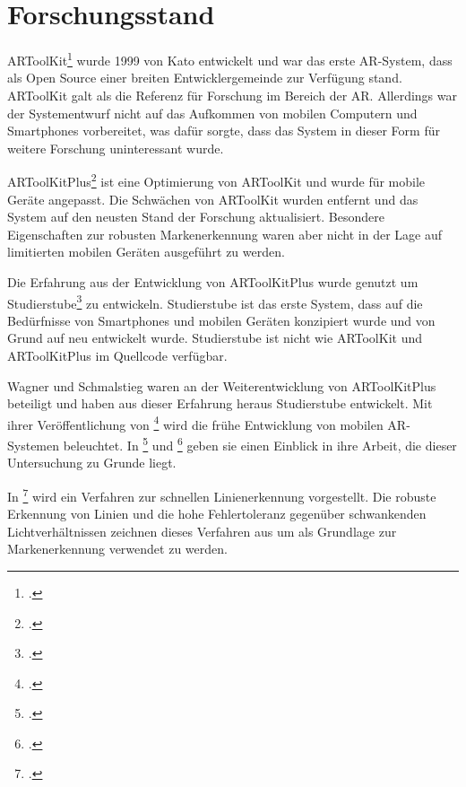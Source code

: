 \section{Forschungsstand} %
\label{sec:forschungsstand}
\begin{comment}
	Forschungsstand: Alle untersuchten Arbeiten aufführen und kurz erklären.
\end{comment}

ARToolKit\footcite{artoolkit} wurde 1999 von Kato entwickelt und war das erste \gls{AR}-System, dass als Open Source einer breiten Entwicklergemeinde zur Verfügung stand. ARToolKit galt als die Referenz für Forschung im Bereich der \gls{AR}. Allerdings war der Systementwurf nicht auf das Aufkommen von mobilen Computern und Smartphones vorbereitet, was dafür sorgte, dass das System in dieser Form für weitere Forschung uninteressant wurde.

ARToolKitPlus\footcite{artoolkitplus} ist eine Optimierung von ARToolKit und wurde für mobile Geräte angepasst. Die Schwächen von ARToolKit wurden entfernt und das System auf den neusten Stand der Forschung aktualisiert. Besondere Eigenschaften zur robusten Mar\-ken\-er\-kennung waren aber nicht in der Lage auf limitierten mobilen Geräten ausgeführt zu werden.

Die Erfahrung aus der Entwicklung von ARToolKitPlus wurde genutzt um Studierstube\footcite{studierstube} zu entwickeln. Studierstube ist das erste System, dass auf die Bedürfnisse von Smartphones und mobilen Geräten konzipiert wurde und von Grund auf neu entwickelt wurde. Studierstube ist nicht wie ARToolKit und ARToolKitPlus im Quellcode verfügbar.

Wagner und Schmalstieg waren an der Weiterentwicklung von ARToolKitPlus beteiligt und haben aus dieser Erfahrung heraus Studierstube entwickelt. Mit ihrer Ver\-öf\-fent\-li\-chung von \footcite{wagner03} wird die frühe Entwicklung von mobilen \gls{AR}-Systemen beleuchtet. In \footcite{wagner09a} und \footcite{wagner09b} geben sie einen Einblick in ihre Arbeit, die dieser Untersuchung zu Grunde liegt.

In \footcite{clarke96} wird ein Verfahren zur schnellen Linienerkennung vorgestellt. Die robuste Erkennung von Linien und die hohe Fehlertoleranz gegenüber schwankenden Lichtverhältnissen zeichnen dieses Verfahren aus um als Grundlage zur Markenerkennung verwendet zu werden.

